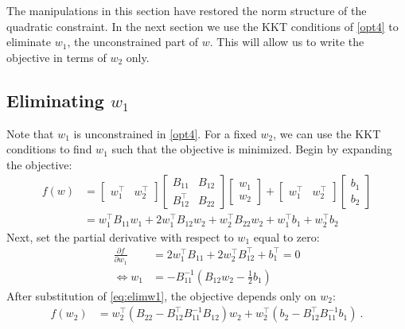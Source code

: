 \documentclass[conference]{IEEEtran}
\begin{document}
The manipulations in this section have restored the norm structure of the quadratic constraint. In the next section we use the KKT conditions of \eqref{opt4} to eliminate $w_1$, the unconstrained part of $w$. This will allow us to write the objective in terms of $w_2$ only.

\subsection{Eliminating $w_1$}

Note that $w_1$ is unconstrained in \eqref{opt4}. For a fixed $w_2$, we can use the KKT
conditions to find $w_1$ such that the objective is minimized. Begin by
expanding the objective:
\begin{align*} f(w) &=
\begin{bmatrix} w_1^\top & w_2^\top \end{bmatrix}
\begin{bmatrix} B_{11} & B_{12} \\ B_{12}^\top & B_{22}\end{bmatrix}
\begin{bmatrix} w_1 \\ w_2 \end{bmatrix} + 
\begin{bmatrix} w_1^\top & w_2^\top \end{bmatrix}
\begin{bmatrix} b_1 \\ b_2\end{bmatrix} \\
&=
w_1^\top B_{11}w_1 + 2w_1^\top B_{12}w_2 + w_2^\top B_{22}w_2 + w_1^\top b_1 + w_2^\top b_2
\end{align*}
Next, set the partial derivative with respect to $w_1$ equal to zero:
\begin{align}
\nonumber \frac{\partial f}{\partial w_1} &= 2w_1^\top B_{11} + 2w_2^\top B_{12}^\top + b_1^\top = 0 \\
\label{eq:elimw1} \iff w_1 &= -B_{11}^{-1}\left(B_{12}w_2 - \frac{1}{2}b_1 \right)
\end{align}
After substitution of \eqref{eq:elimw1}, the objective depends only on $w_2$:
\begin{align*}
f(w_2) &= w_2^\top\left(B_{22} - B_{12}^\top B_{11}^{-1} B_{12}\right)w_2 + 
w_2^\top (b_2 - B_{12}^\top B_{11}^{-1}b_1)~.
\end{align*}
\end{document}
